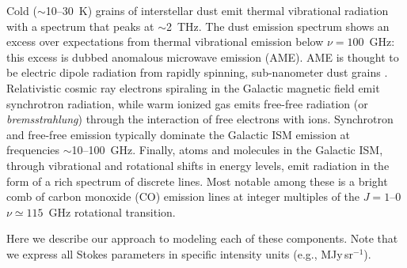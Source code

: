 \documentclass[twocolumn]{aastex631}
\begin{document}
Cold ($\sim$10--30~K) grains of interstellar dust emit thermal vibrational radiation with a spectrum that peaks at $\sim$2~THz. The dust emission spectrum shows an excess over expectations from thermal vibrational emission below $\nu=100$~GHz: this excess is dubbed anomalous microwave emission (AME). AME is thought to be electric dipole radiation from rapidly spinning, sub-nanometer dust grains \citep{Draine:1998}. Relativistic cosmic ray electrons spiraling in the Galactic magnetic field emit synchrotron radiation, while warm ionized gas emits free-free radiation (or \emph{bremsstrahlung}) through the interaction of free electrons with ions. Synchrotron and free-free emission typically dominate the Galactic ISM emission at frequencies $\sim$10--100~GHz. Finally, atoms and molecules in the Galactic ISM, through vibrational and rotational shifts in energy levels, emit radiation in the form of a rich spectrum of discrete lines. Most notable among these is a bright comb of carbon monoxide (CO) emission lines at integer multiples of the $J=1$--$0$ $\nu \simeq 115$~GHz rotational transition.



Here we describe our approach to modeling each of these components. Note that we express all Stokes parameters in specific intensity units (e.g., MJy\,sr$^{-1}$).
\end{document}
